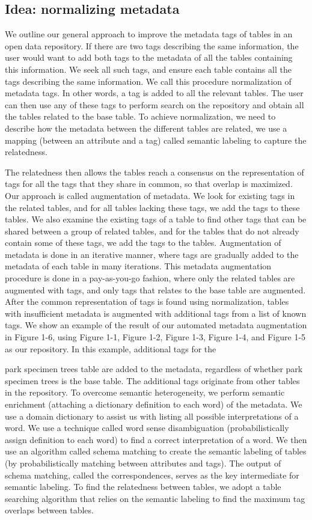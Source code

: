 \subsection{Idea: normalizing metadata}
We outline our general approach to improve the metadata tags of tables in an open data repository. If there are two tags describing the same information, the user would want to add both tags to the metadata of all the tables containing this information. We seek all such tags, and ensure each table contains all the tags describing the same information. We call this procedure normalization of metadata tags. In other words, a tag is added to all the relevant tables.
The user can then use any of these tags to perform search on the repository and obtain all the tables related to the base table. To achieve normalization, we need to describe how the metadata between the different tables are related, we use a mapping (between an attribute and a tag) called semantic labeling to capture the relatedness.


The relatedness then allows the tables reach a consensus on the representation of tags for all the tags that they share in common, so that overlap is maximized. Our approach is called augmentation of metadata. We look for existing tags in the related tables, and for all tables lacking these tags, we add the tags to these tables. We also examine the existing tags of a table to find other tags that can be shared between a group of related tables, and for the tables that do not already contain some of these tags, we add the tags to the tables. Augmentation of metadata is done in an iterative manner, where tags are gradually added to the metadata of each table in many iterations. This metadata augmentation procedure is done in a pay-as-you-go fashion, where only the related tables are augmented with tags, and only tags that relates to the base table are augmented.
After the common representation of tags is found using normalization, tables with insufficient metadata is augmented with additional tags from a list of known tags. We show an example of the result of our automated metadata augmentation in Figure 1-6, using Figure 1-1, Figure 1-2, Figure 1-3, Figure 1-4, and Figure 1-5 as our repository. In this example, additional tags for the

park specimen trees table are added to the metadata, regardless of whether park specimen trees is the base table. The additional tags originate from other tables in the repository.
To overcome semantic heterogeneity, we perform semantic enrichment (attaching a dictionary definition to each word) of the metadata. We use a domain dictionary to assist us with listing all possible interpretations of a word. We use a technique called word sense disambiguation (probabilistically assign definition to each word) to find a correct interpretation of a word. We then use an algorithm called schema matching to create the semantic labeling of tables (by probabilistically matching between attributes and tags). The output of schema matching, called the correspondences, serves as the key intermediate for semantic labeling. To find the relatedness between tables, we adopt a table searching algorithm that relies on the semantic labeling to find the maximum tag overlaps between tables.

